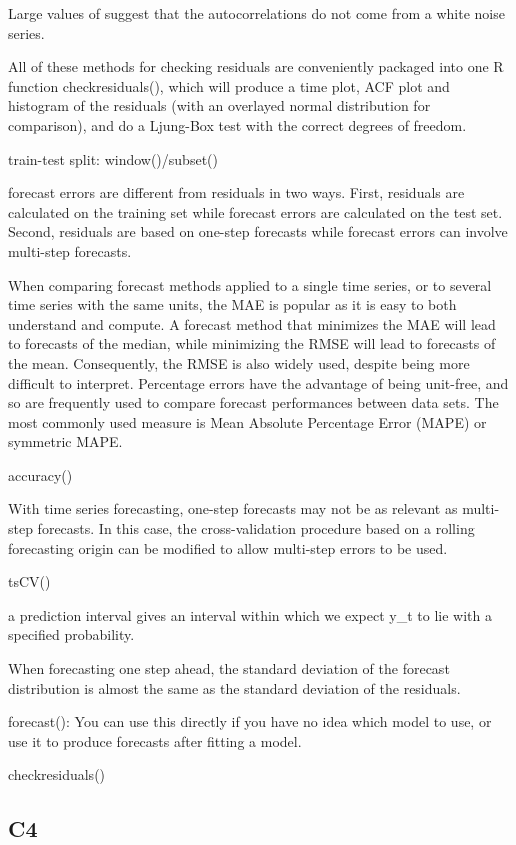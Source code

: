 \documentclass[]{book}
\begin{document}
Large values of suggest that the autocorrelations do not come from a
white noise series.

All of these methods for checking residuals are conveniently packaged
into one R function checkresiduals(), which will produce a time plot,
ACF plot and histogram of the residuals (with an overlayed normal
distribution for comparison), and do a Ljung-Box test with the correct
degrees of freedom.

train-test split: window()/subset()

forecast errors are different from residuals in two ways. First,
residuals are calculated on the training set while forecast errors are
calculated on the test set. Second, residuals are based on one-step
forecasts while forecast errors can involve multi-step forecasts.

When comparing forecast methods applied to a single time series, or to
several time series with the same units, the MAE is popular as it is
easy to both understand and compute. A forecast method that minimizes
the MAE will lead to forecasts of the median, while minimizing the RMSE
will lead to forecasts of the mean. Consequently, the RMSE is also
widely used, despite being more difficult to interpret. Percentage
errors have the advantage of being unit-free, and so are frequently used
to compare forecast performances between data sets. The most commonly
used measure is Mean Absolute Percentage Error (MAPE) or symmetric MAPE.

accuracy()

With time series forecasting, one-step forecasts may not be as relevant
as multi-step forecasts. In this case, the cross-validation procedure
based on a rolling forecasting origin can be modified to allow
multi-step errors to be used.

tsCV()

a prediction interval gives an interval within which we expect y\_t to
lie with a specified probability.

When forecasting one step ahead, the standard deviation of the forecast
distribution is almost the same as the standard deviation of the
residuals.

forecast(): You can use this directly if you have no idea which model to
use, or use it to produce forecasts after fitting a model.

checkresiduals()

\subsection{C4}\label{c4}
\end{document}
